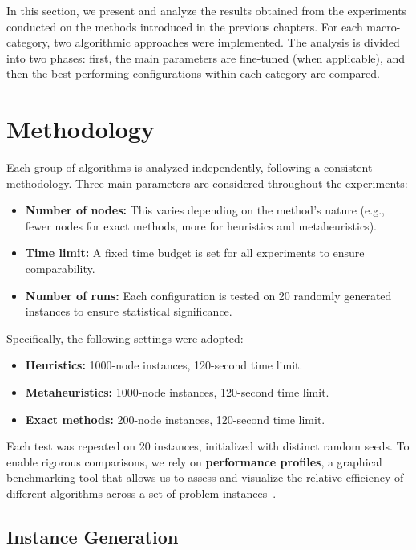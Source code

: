 In this section, we present and analyze the results obtained from the experiments conducted on the methods introduced in the previous chapters. For each macro-category, two algorithmic approaches were implemented. The analysis is divided into two phases: first, the main parameters are fine-tuned (when applicable), and then the best-performing configurations within each category are compared.

\section{Methodology}

Each group of algorithms is analyzed independently, following a consistent methodology. Three main parameters are considered throughout the experiments:
\begin{itemize}
    \item \textbf{Number of nodes:} This varies depending on the method's nature (e.g., fewer nodes for exact methods, more for heuristics and metaheuristics).
    \item \textbf{Time limit:} A fixed time budget is set for all experiments to ensure comparability.
    \item \textbf{Number of runs:} Each configuration is tested on 20 randomly generated instances to ensure statistical significance.
\end{itemize}

Specifically, the following settings were adopted:
\begin{itemize}
    \item \textbf{Heuristics:} 1000-node instances, 120-second time limit.
    \item \textbf{Metaheuristics:} 1000-node instances, 120-second time limit.
    \item \textbf{Exact methods:} 200-node instances, 120-second time limit.
\end{itemize}

Each test was repeated on 20 instances, initialized with distinct random seeds. To enable rigorous comparisons, we rely on \textbf{performance profiles}, a graphical benchmarking tool that allows us to assess and visualize the relative efficiency of different algorithms across a set of problem instances~\cite{dolan2002performance}.

\subsection{Instance Generation}

